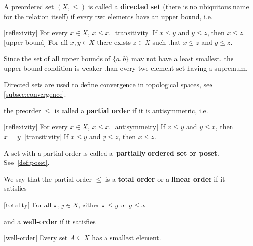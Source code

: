 \begin{definition}
\begin{defenum}
    \cite[8]{Engelking1989} A preordered set \( (X, \leq) \) is called a \textbf{directed set} (there is no ubiquitous name for the relation itself) if every two elements have an upper bound, i.e.
    \begin{description}
      [reflexivity] For every \( x \in X \), \( x \leq x \).
      [transitivity] If \( x \leq y \) and \( y \leq z \), then \( x \leq z \).
      [upper bound] For all \( x, y \in X \) there exists \( z \in X \) such that \( x \leq z \) and \( y \leq z \).
    \end{description}

    Since the set of all upper bounds of \( \{ a, b \} \) may not have a least smallest, the upper bound condition is weaker than every two-element set having a supremum.

    Directed sets are used to define convergence in topological spaces, see \cref{subsec:convergence}.

    \cite[7]{Engelking1989} the preorder \( \leq \) is called a \textbf{partial order} if it is antisymmetric, i.e.
    \begin{description}
      [reflexivity] For every \( x \in X \), \( x \leq x \).
      [antisymmetry] If \( x \leq y \) and \( y \leq x \), then \( x = y \).
      [transitivity] If \( x \leq y \) and \( y \leq z \), then \( x \leq z \).
    \end{description}

    A set with a partial order is called a~\textbf{partially ordered set or poset}. See~\cref{def:poset}.

    We say that the partial order \( \leq \) is a \textbf{total order} or a \textbf{linear order} if it satisfies
    \begin{description}
      [totality] For all \( x, y \in X \), either \( x \leq y \) or \( y \leq x \)
    \end{description}
    and a \textbf{well-order} if it satisfies
    \begin{description}
      [well-order] Every set \( A \subseteq X \) has a smallest element.
    \end{description}


\end{defenum}
\end{definition}
